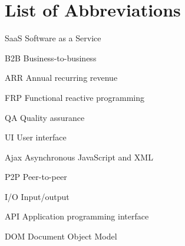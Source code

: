 \chapter*{List of Abbreviations}

\begin{abbreviations}
\item[SaaS] Software as a Service
\item[B2B] Business-to-business
\item[ARR] Annual recurring revenue
\item[FRP] Functional reactive programming
\item[QA] Quality assurance
\item[UI] User interface
\item[Ajax] Asynchronous JavaScript and XML
\item[P2P] Peer-to-peer
\item[I/O] Input/output
\item[API] Application programming interface
\item[DOM] Document Object Model
\end{abbreviations}
